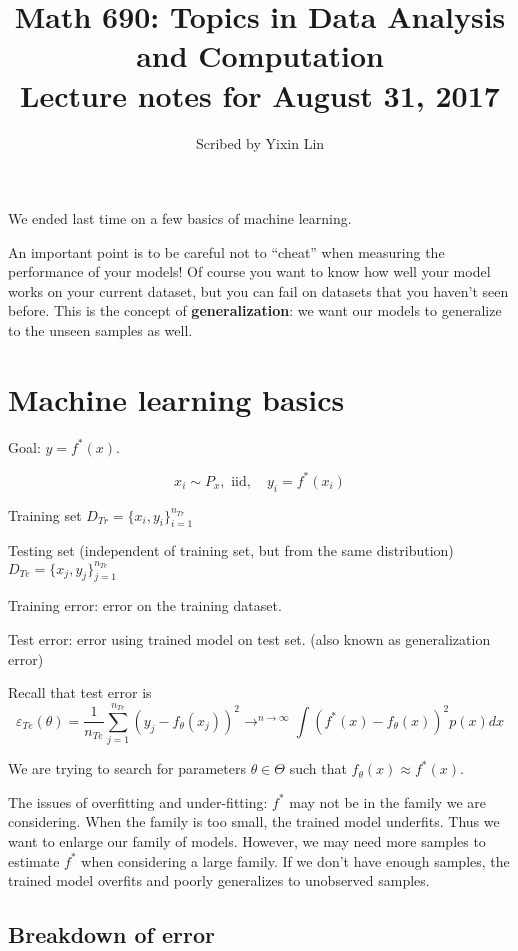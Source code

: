 \documentclass[12pt]{article}
\title{Math 690: Topics in Data Analysis and Computation \\ 
Lecture notes for August 31, 2017}
\date{}
\author{Scribed by Yixin Lin}
\theoremstyle{plain}
\begin{document}
\maketitle

We ended last time on a few basics of machine learning.

An important point is to be careful not to ``cheat'' when measuring the performance of your models! Of course you want to know how well your model works on your current dataset, but you can fail on datasets that you haven't seen before. This is the concept of \textbf{generalization}: we want our models to generalize to the unseen samples as well.

\section*{Machine learning basics}

Goal: $y = f^* (x)$.

$$x_i \sim P_x, \text{ iid}, \quad y_i = f^*(x_i) $$

Training set $D_{Tr} = \{x_i, y_i \}_{i=1}^{n_{Tr}}$

Testing set (independent of training set, but from the same distribution) $D_{Te} = \{x_j, y_j\}_{j=1}^{n_{Te}}$

Training error: error on the training dataset.

Test error: error using trained model on test set. (also known as generalization error)



Recall that test error is $$\varepsilon_{Te} (\theta) = \frac{1}{n_{Te}} \sum_{j=1}^{n_{Te}} (y_j - f_\theta (x_j))^2 \rightarrow^{n \rightarrow \infty} \int (f^*(x)-f_\theta(x))^2 p(x) dx$$

We are trying to search for parameters $\theta \in \Theta$ such that $ f_\theta(x) \approx f^*(x) $.

The issues of overfitting and under-fitting:
$f^*$ may not be in the family we are considering.
When the family  is too small, the trained model underfits.
Thus we want to enlarge our family of models. However, we may need more samples to estimate $f^*$ when considering a large family.
If we don't have enough samples, the trained model overfits and poorly generalizes to unobserved samples.

\subsection*{Breakdown of error}
\end{document}
